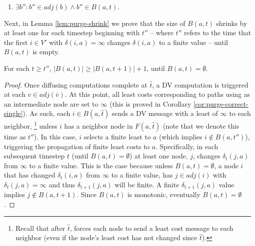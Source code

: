 {{\begin{define}
\begin{enumerate}
	\item $\exists b'': b'' \in adj(b) \wedge b'' \in B(a,t)$.

\end{enumerate}
\end{define}


Next, in Lemma \ref{lem:purge-shrink} we prove that the size of $B(a,t)$ shrinks by at least one for each timestep beginning with $t''$ -- where
$t''$ refers to the time that the first $i \in V'$ with $\delta(i,a) = \infty$ changes $\delta(i,a)$ to a finite value -- until $B(a,t)$ is empty.

\begin{lemma}
\label{lem:purge-shrink}
For each $t \geq t''$, $|B(a,t)| \geq |B(a,t+1)| + 1$, until $B(a,t) = \emptyset$.
\end{lemma}
\begin{proof}
Once \purge diffusing computations complete at $\hat{t}$, a DV computation is triggered at each $v \in adj(\overline{v})$. 
At this point, all least costs corresponding to paths using \bad as an intermediate node are set to $\infty$ (this is proved in Corollary \ref{cor:purge-correct-single}).
As such, each $i \in B(a,\hat{t})$ sends a DV message
with a least of $\infty$ to each neighbor, {\footnote {\small Recall that after $\hat{t}$, \purge forces each node to send a least cost message to each neighbor 
(even if the node's least cost has not changed since $\hat{t}$). }} 
unless $i$ has a neighbor node in $F(a,\hat{t})$ (note that we denote this time as $t''$). 
In this case, $i$ selects a finite least to $a$ (which implies $i \notin B(a,t'')$), triggering the propagation of finite least costs to $a$.  Specifically, in each 
subsequent timestep $t$ (until $B(a,t) = \emptyset$) at least one node, $j$, changes $\delta_t(j,a)$ from $\infty$ to a finite value.  This is the case because unless $B(a,t) = \emptyset$, 
a node $i$ that has changed $\delta_t(i,a)$ from $\infty$ to a finite value, has $j \in adj(i)$ with $\delta_{t}(j,a) = \infty$ and thus $\delta_{t+1}(j,a)$ will be finite.  
A finite $\delta_{t+1}(j,a)$ value implies $j \notin B(a,t+1)$. Since $B(a,t)$ is monotonic, eventually $B(a,t) = \emptyset$. 
\end{proof}

}}
